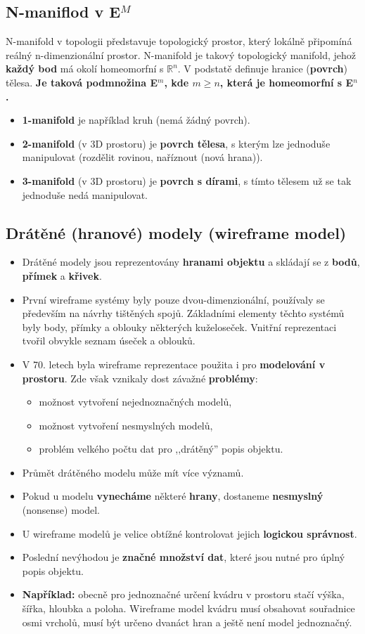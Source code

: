 \subsection{N-maniflod v E$^M$}
N-manifold v topologii představuje topologický prostor, který lokálně připomíná reálný n-dimenzionální prostor. N-manifold je takový topologický manifold, jehož \textbf{každý bod} má okolí homeomorfní s $\mathbb{R}^n$. V podstatě definuje hranice (\textbf{povrch}) tělesa. \textbf{Je taková podmnožina E$^m$, kde $m \geq n$, která je homeomorfní s E$^n$.}
\begin{itemize}
\item \textbf{1-manifold} je například kruh (nemá žádný povrch).
\item \textbf{2-manifold} (v 3D prostoru) je \textbf{povrch tělesa}, s kterým lze jednoduše manipulovat (rozdělit rovinou, naříznout (nová hrana)).
\item \textbf{3-manifold} (v 3D prostoru) je \textbf{povrch s dírami}, s tímto tělesem už se tak jednoduše nedá manipulovat.
\end{itemize}

\subsection{Drátěné (hranové) modely (wireframe model)}
\begin{itemize}
	\item Drátěné modely jsou reprezentovány \textbf{hranami objektu} a skládají se z \textbf{bodů}, \textbf{přímek} a \textbf{křivek}.
	\item První wireframe systémy byly pouze dvou-dimenzionální, používaly se především na návrhy tištěných spojů. Základními elementy těchto systémů byly body, přímky a oblouky některých kuželoseček. Vnitřní reprezentaci tvořil obvykle seznam úseček a oblouků.
	\item V 70. letech byla wireframe reprezentace použita i pro \textbf{modelování v prostoru}. Zde však vznikaly dost závažné \textbf{problémy}:
	\begin{itemize}
		\item možnost vytvoření nejednoznačných modelů,
		\item možnost vytvoření nesmyslných modelů,
		\item problém velkého počtu dat pro ,,drátěný'' popis objektu.
	\end{itemize}
	\item Průmět drátěného modelu může mít více významů.
	\item Pokud u modelu \textbf{vynecháme} některé \textbf{hrany}, dostaneme \textbf{nesmyslný} (nonsense) model.
	\item U wireframe modelů je velice obtížné kontrolovat jejich \textbf{logickou správnost}.
	\item Poslední nevýhodou je \textbf{značné množství dat}, které jsou nutné pro úplný popis objektu. 
	\item \textbf{Například:} obecně pro jednoznačné určení kvádru v prostoru stačí výška, šířka, hloubka a poloha. Wireframe model kvádru musí obsahovat souřadnice osmi vrcholů, musí být určeno dvanáct hran a ještě není model jednoznačný.
\end{itemize}

